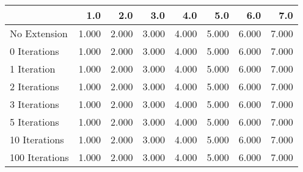 \begin{tabular}{lrrrrrrr}
\toprule
{} &   1.0 &   2.0 &   3.0 &   4.0 &   5.0 &   6.0 &   7.0 \\
\midrule
No Extension   & 1.000 & 2.000 & 3.000 & 4.000 & 5.000 & 6.000 & 7.000 \\
0 Iterations   & 1.000 & 2.000 & 3.000 & 4.000 & 5.000 & 6.000 & 7.000 \\
1 Iteration    & 1.000 & 2.000 & 3.000 & 4.000 & 5.000 & 6.000 & 7.000 \\
2 Iterations   & 1.000 & 2.000 & 3.000 & 4.000 & 5.000 & 6.000 & 7.000 \\
3 Iterations   & 1.000 & 2.000 & 3.000 & 4.000 & 5.000 & 6.000 & 7.000 \\
5 Iterations   & 1.000 & 2.000 & 3.000 & 4.000 & 5.000 & 6.000 & 7.000 \\
10 Iterations  & 1.000 & 2.000 & 3.000 & 4.000 & 5.000 & 6.000 & 7.000 \\
100 Iterations & 1.000 & 2.000 & 3.000 & 4.000 & 5.000 & 6.000 & 7.000 \\
\bottomrule
\end{tabular}
